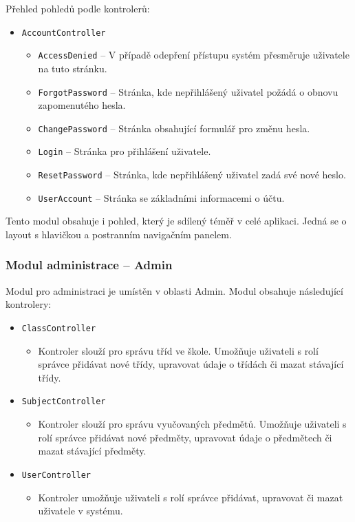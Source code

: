 \clearpage
Přehled pohledů podle kontrolerů:

\begin{itemize}
    \item \texttt{AccountController}
    \begin{itemize}
        \item \texttt{AccessDenied} -- V případě odepření přístupu systém přesměruje uživatele na tuto stránku.
        \item \texttt{ForgotPassword} -- Stránka, kde nepřihlášený uživatel požádá o obnovu zapomenutého hesla.
        \item \texttt{ChangePassword} -- Stránka obsahující formulář pro změnu hesla.
        \item \texttt{Login} -- Stránka pro přihlášení uživatele.
        \item \texttt{ResetPassword} -- Stránka, kde nepřihlášený uživatel zadá své nové heslo.
        \item \texttt{UserAccount} -- Stránka se základními informacemi o účtu.
    \end{itemize}
\end{itemize}

Tento modul obsahuje i pohled, který je sdílený téměř v celé aplikaci. Jedná se o layout s hlavičkou a postranním navigačním panelem.


\subsubsection{Modul administrace -- Admin}
Modul pro administraci je umístěn v oblasti Admin. Modul obsahuje následující kontrolery:
\begin{itemize}
    \item \texttt{ClassController}
    \begin{itemize}
        \item Kontroler slouží pro správu tříd ve škole. Umožňuje uživateli s rolí správce přidávat nové třídy, upravovat údaje o třídách či mazat stávající třídy.
    \end{itemize}
    
    \item \texttt{SubjectController}
    \begin{itemize}
        \item Kontroler slouží pro správu vyučovaných předmětů. Umožňuje uživateli s rolí správce přidávat nové předměty, upravovat údaje o předmětech či mazat stávající předměty.
    \end{itemize}
    \item \texttt{UserController}
    \begin{itemize}
        \item Kontroler umožňuje uživateli s rolí správce přidávat, upravovat či mazat uživatele v systému.
    \end{itemize}
\end{itemize}

